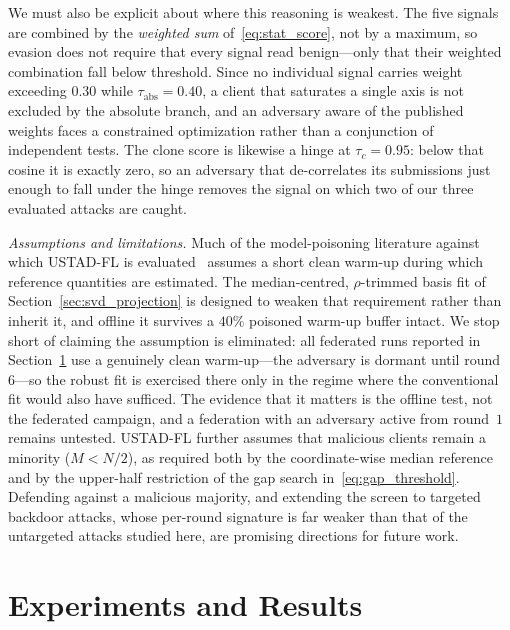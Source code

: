 \documentclass[journal]{IEEEtran}
\begin{document}
We must also be explicit about where this reasoning is weakest. The five signals are combined by the \emph{weighted sum} of~\eqref{eq:stat_score}, not by a maximum, so evasion does not require that every signal read benign---only that their weighted combination fall below threshold. Since no individual signal carries weight exceeding $0.30$ while $\tau_{\mathrm{abs}} = 0.40$, a client that saturates a single axis is not excluded by the absolute branch, and an adversary aware of the published weights faces a constrained optimization rather than a conjunction of independent tests. The clone score is likewise a hinge at $\tau_c = 0.95$: below that cosine it is exactly zero, so an adversary that de-correlates its submissions just enough to fall under the hinge removes the signal on which two of our three evaluated attacks are caught.

\noindent\textit{Assumptions and limitations.} Much of the model-poisoning literature against which USTAD-FL is evaluated~\cite{baruch2019little, shejwalkar2021manipulating} assumes a short clean warm-up during which reference quantities are estimated. The median-centred, $\rho$-trimmed basis fit of Section~\ref{sec:svd_projection} is designed to weaken that requirement rather than inherit it, and offline it survives a $40\%$ poisoned warm-up buffer intact. We stop short of claiming the assumption is eliminated: all federated runs reported in Section~\ref{sec:experiments} use a genuinely clean warm-up---the adversary is dormant until round~$6$---so the robust fit is exercised there only in the regime where the conventional fit would also have sufficed. The evidence that it matters is the offline test, not the federated campaign, and a federation with an adversary active from round~$1$ remains untested. USTAD-FL further assumes that malicious clients remain a minority ($M < N/2$), as required both by the coordinate-wise median reference and by the upper-half restriction of the gap search in~\eqref{eq:gap_threshold}. Defending against a malicious majority, and extending the screen to targeted backdoor attacks, whose per-round signature is far weaker than that of the untargeted attacks studied here, are promising directions for future work.

\section{Experiments and Results}
\label{sec:experiments}
\end{document}
